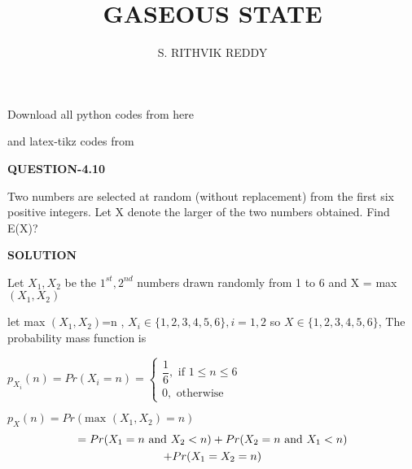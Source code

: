 \documentclass[a4paper]{article}
\title{GASEOUS STATE}
\author{S. RITHVIK REDDY }
\begin{document}
\maketitle
\noindent
Download all python codes from here

\begin{multicols*}{2}
\noindent
{}
    
\vspace{0.3cm}
and latex-tikz codes from  

\vspace{0.3cm}  
    
   
\vspace{0.5cm}
\textbf{QUESTION-4.10}
\vspace{0.5cm}

Two numbers are selected at random (without replacement) from the first six positive integers. Let X denote the larger of the two numbers obtained. Find E(X)?



\vspace{0.5cm}
\textbf{SOLUTION}
\vspace{0.5cm}

Let $X_1,X_2$ be the $1^{st},2^{nd}$ numbers drawn randomly from 1 to 6 and X = max $(X_1,X_2)$

let max $(X_1,X_2)$=n , $X_i\in \{ 1,2,3,4,5,6 \}, i=1,2$ so $X \in \{ 1,2,3,4,5,6 \}$, The probability mass function is 

\vspace{0.5cm}
$p_{X_i}(n)= Pr(X_i=n)= \begin{cases}
\dfrac{1}{6},  \text{ if } 1 \leq n \leq 6 \\
0,  \text{  otherwise }
\end{cases}$

 $p_X(n) =Pr(\text{max } (X_1,X_2)=n)$
 \begin{multline}
 \noindent
 =Pr(X_1=n\text{ and }X_2<n)
 +Pr(X_2=n\text{ and }X_1<n)\\+Pr(X_1=X_2=n)\label{eqn_(0.0.2)}
\end{multline}
 


\end{multicols*}
\end{document}
